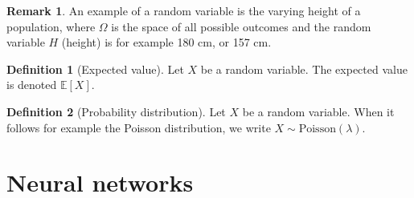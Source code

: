 \documentclass[a4paper, 12pt]{report}
\theoremstyle{definition}
\newtheorem{definition}{Definition}
\newtheorem*{remark}{Remark}
\begin{document}
\begin{remark}
    An example of a random variable is the varying height of a population, where $\Omega$ is the
    space of all possible outcomes and the random variable $H$ (height) is for example 180 cm, or 157 cm. 
\end{remark}

\begin{definition}[Expected value]
    Let $X$ be a random variable. The expected value is denoted $\mathbb E[X]$.
\end{definition}

\begin{definition}[Probability distribution]
    Let $X$ be a random variable. When it follows for example the Poisson distribution, we write
    $X \sim \text{Poisson}(\lambda)$.
\end{definition}

\section{Neural networks}
\end{document}

